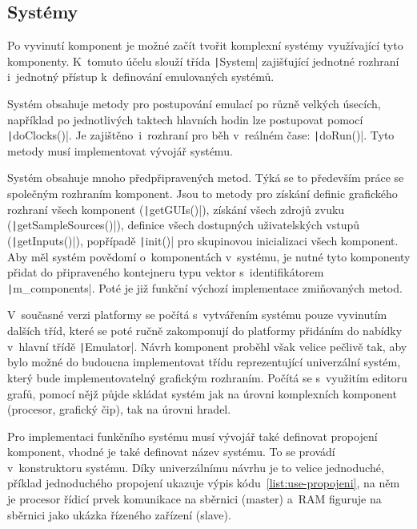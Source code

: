 \subsection{Systémy}
Po vyvinutí komponent je možné začít tvořit komplexní systémy využívající tyto komponenty. K~tomuto účelu slouží třída \texttt|System| zajišťující jednotné rozhraní i~jednotný přístup k~definování emulovaných systémů.

Systém obsahuje metody pro postupování emulací po různě velkých úsecích, například po jednotlivých taktech hlavních hodin lze postupovat pomocí \texttt|doClocks()|. Je zajištěno~i~rozhraní pro běh v~reálném čase: \texttt|doRun()|. Tyto metody musí implementovat vývojář systému.

Systém obsahuje mnoho předpřipravených metod. Týká se to především práce se společným rozhraním komponent. Jsou to metody pro získání definic grafického rozhraní všech komponent (\texttt|getGUIs()|), získání všech zdrojů zvuku (\texttt|getSampleSources()|), definice všech dostupných uživatelských vstupů (\texttt|getInputs()|), popřípadě \texttt|init()| pro skupinovou inicializaci všech komponent. Aby měl systém povědomí o~komponentách v~systému, je nutné tyto komponenty přidat do připraveného kontejneru typu vektor s~identifikátorem \texttt|m_components|. Poté je již funkční výchozí implementace zmiňovaných metod.

\begin{note}
	V~současné verzi platformy se počítá s~vytvářením systému pouze vyvinutím dalších tříd, které se poté ručně zakomponují do platformy přidáním do nabídky v~hlavní třídě \texttt|Emulator|. Návrh komponent proběhl však velice pečlivě tak, aby bylo možné do budoucna implementovat třídu reprezentující univerzální systém, který bude implementovatelný grafickým rozhraním. Počítá se s~využitím editoru grafů, pomocí nějž půjde skládat systém jak na úrovni komplexních komponent (procesor, grafický čip), tak na úrovni hradel.
\end{note}

Pro implementaci funkčního systému musí vývojář také definovat propojení komponent, vhodné je také definovat název systému. To se provádí v~konstruktoru systému. Díky univerzálnímu návrhu je to velice jednoduché, příklad jednoduchého propojení ukazuje výpis kódu~\ref{list:use-propojeni}, na něm je procesor řídicí prvek komunikace na sběrnici (master) a~RAM figuruje na sběrnici jako ukázka řízeného zařízení (slave).

